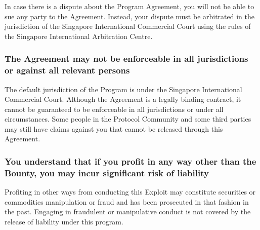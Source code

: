 In case there is a dispute about the Program Agreement, you will not be able to sue any party to the Agreement. Instead, your dispute must be arbitrated in the jurisdiction of the Singapore International Commercial Court using the rules of the Singapore International Arbitration Centre.

\subsubsection*{The Agreement may not be enforceable in all jurisdictions or against all relevant persons}\label{exhibit:e:enforceability}

The default jurisdiction of the Program is under the Singapore International Commercial Court. Although the Agreement is a legally binding contract, it cannot be guaranteed to be enforceable in all jurisdictions or under all circumstances. Some people in the Protocol Community and some third parties may still have claims against you that cannot be released through this Agreement.

\subsubsection*{You understand that if you profit in any way other than the Bounty, you may incur significant risk of liability}\label{exhibit:e:profit_risks}

Profiting in other ways from conducting this Exploit may constitute securities or commodities manipulation or fraud and has been prosecuted in that fashion in the past. Engaging in fraudulent or manipulative conduct is not covered by the release of liability under this program.
